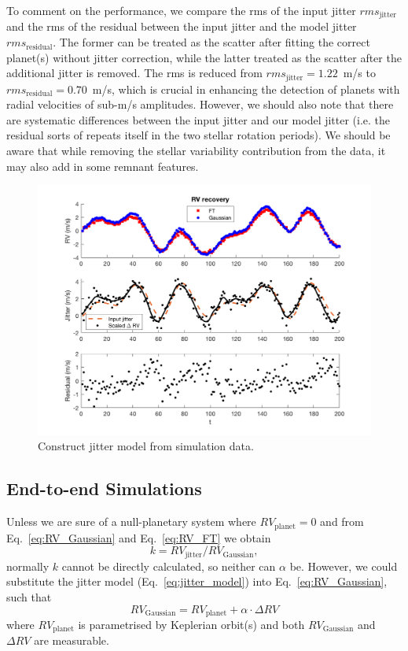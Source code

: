 To comment on the performance, we compare the rms of the input jitter $rms_\text{jitter}$
and the rms of the residual between the input jitter and the model jitter $rms_\text{residual}$. 
The former can be treated as the scatter after fitting the correct planet(s) without jitter correction, 
while the latter treated as the scatter after the additional jitter is removed.
The rms is reduced from $rms_\text{jitter} = 1.22$~m/s to $rms_\text{residual} = 0.70$~m/s,
which is crucial in enhancing the detection of planets with radial velocities of sub-m/s amplitudes. 
However, we should also note that there are systematic differences between the input jitter and our model jitter
(i.e. the residual sorts of repeats itself in the two stellar rotation periods). We should be aware that 
while removing the stellar variability contribution from the data, it may also add in some remnant features. 

\begin{figure}[tbp]
\centering
\includegraphics[width = 0.99 \linewidth]
{./Figures/Methods/5-PLANET_AND_JITTER.png}
\caption[Jitter model]
{Construct jitter model from simulation data.}
\label{fig:PLANET_AND_JITTER}
\end{figure} 


\subsection{End-to-end Simulations}

Unless we are sure of a null-planetary system where $RV_\text{planet} = 0$ and
from Eq.~\ref{eq:RV_Gaussian} and Eq.~\ref{eq:RV_FT} we obtain
\begin{equation}
	k = RV_\text{jitter} / RV_\text{Gaussian},
\end{equation} 
normally $k$ cannot be directly calculated, so neither can $\alpha$ be.
However, we could substitute the jitter model (Eq.~\ref{eq:jitter_model}) into Eq.~\ref{eq:RV_Gaussian}, such that
\begin{equation}
	RV_\text{Gaussian} = RV_\text{planet} + \alpha \cdot \Delta RV
\label{eq:RV_fit}
\end{equation}
where $RV_\text{planet}$ is parametrised by Keplerian orbit(s) and both $RV_\text{Gaussian}$ and $\Delta RV$ 
are measurable. 

